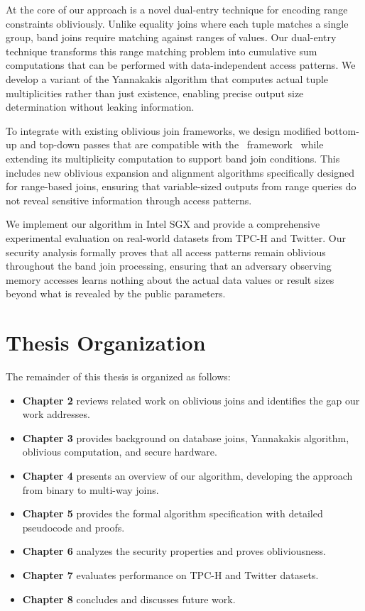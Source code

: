 At the core of our approach is a novel dual-entry technique for encoding range constraints obliviously. Unlike equality joins where each tuple matches a single group, band joins require matching against ranges of values. Our dual-entry technique transforms this range matching problem into cumulative sum computations that can be performed with data-independent access patterns. We develop a variant of the Yannakakis algorithm that computes actual tuple multiplicities rather than just existence, enabling precise output size determination without leaking information.

To integrate with existing oblivious join frameworks, we design modified bottom-up and top-down passes that are compatible with the \odbj\ framework~\cite{krastnikov2020} while extending its multiplicity computation to support band join conditions. This includes new oblivious expansion and alignment algorithms specifically designed for range-based joins, ensuring that variable-sized outputs from range queries do not reveal sensitive information through access patterns.

We implement our algorithm in Intel SGX and provide a comprehensive experimental evaluation on real-world datasets from TPC-H and Twitter. Our security analysis formally proves that all access patterns remain oblivious throughout the band join processing, ensuring that an adversary observing memory accesses learns nothing about the actual data values or result sizes beyond what is revealed by the public parameters.

\section{Thesis Organization}

The remainder of this thesis is organized as follows:

\begin{itemize}
\item \textbf{Chapter 2} reviews related work on oblivious joins and identifies the gap our work addresses.
\item \textbf{Chapter 3} provides background on database joins, Yannakakis algorithm, oblivious computation, and secure hardware.
\item \textbf{Chapter 4} presents an overview of our algorithm, developing the approach from binary to multi-way joins.
\item \textbf{Chapter 5} provides the formal algorithm specification with detailed pseudocode and proofs.
\item \textbf{Chapter 6} analyzes the security properties and proves obliviousness.
\item \textbf{Chapter 7} evaluates performance on TPC-H and Twitter datasets.
\item \textbf{Chapter 8} concludes and discusses future work.
\end{itemize}